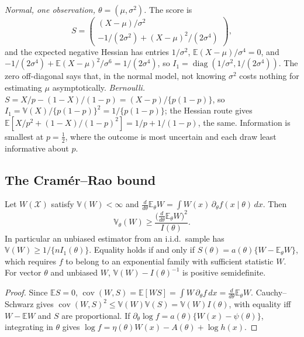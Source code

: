 \documentclass[11pt,a4paper]{article}
\newcommand{\E}{\mathbb{E}}
\newcommand{\V}{\mathbb{V}}
\newcommand{\Cov}{\operatorname{cov}}
\newcommand{\diag}{\operatorname{diag}}
\newcommand{\iid}{i.i.d.}
\begin{document}
\begin{example}\label{ex:info}
\emph{Normal, one observation, $\theta=(\mu,\sigma^2)$.} The score is
\[
S=\begin{pmatrix}(X-\mu)/\sigma^2\\ -1/(2\sigma^2)+(X-\mu)^2/(2\sigma^4)\end{pmatrix},
\]
and the expected negative Hessian has entries $1/\sigma^2$, $\E(X-\mu)/\sigma^4=0$, and $-1/(2\sigma^4)+\E(X-\mu)^2/\sigma^6=1/(2\sigma^4)$, so $I_1=\diag(1/\sigma^2,1/(2\sigma^4))$. The zero off-diagonal says that, in the normal model, not knowing $\sigma^2$ costs nothing for estimating $\mu$ asymptotically.
\emph{Bernoulli.} $S=X/p-(1-X)/(1-p)=(X-p)/\{p(1-p)\}$, so $I_1=\V(X)/\{p(1-p)\}^2=1/\{p(1-p)\}$; the Hessian route gives $\E[X/p^2+(1-X)/(1-p)^2]=1/p+1/(1-p)$, the same. Information is smallest at $p=\frac12$, where the outcome is most uncertain and each draw least informative about $p$.
\end{example}

\subsection{The Cram\'er--Rao bound}

\begin{theorem}\label{thm:cr}
Let $W(\mathcal X)$ satisfy $\V(W)<\infty$ and $\frac{d}{d\theta}\E_\theta W=\int W(x)\,\partial_\theta f(x\mid\theta)\,dx$. Then
\[
\V_\theta(W)\ge\frac{\big(\frac{d}{d\theta}\E_\theta W\big)^2}{I(\theta)} .
\]
In particular an unbiased estimator from an \iid\ sample has $\V(W)\ge1/\{nI_1(\theta)\}$. Equality holds if and only if $S(\theta)=a(\theta)\{W-\E_\theta W\}$, which requires $f$ to belong to an exponential family with sufficient statistic $W$. For vector $\theta$ and unbiased $W$, $\V(W)-I(\theta)^{-1}$ is positive semidefinite.
\end{theorem}

\begin{proof}
Since $\E S=0$, $\Cov(W,S)=\E[WS]=\int W\,\partial_\theta f\,dx=\frac{d}{d\theta}\E_\theta W$. Cauchy--Schwarz gives $\Cov(W,S)^2\le\V(W)\V(S)=\V(W)I(\theta)$, with equality iff $W-\E W$ and $S$ are proportional. If $\partial_\theta\log f=a(\theta)\{W(x)-\psi(\theta)\}$, integrating in $\theta$ gives $\log f=\eta(\theta)W(x)-A(\theta)+\log h(x)$.
\end{proof}
\end{document}
